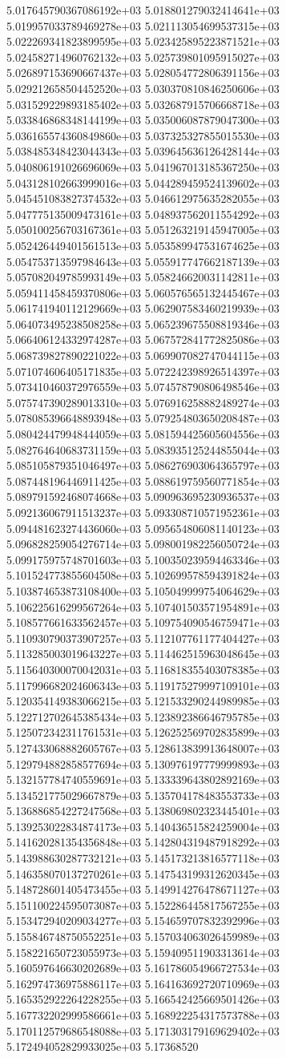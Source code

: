 	5.017645790367086192e+03	5.018801279032414641e+03	5.019957033789469278e+03	5.021113054699537315e+03	5.022269341823899595e+03	5.023425895223871521e+03	5.024582714960762132e+03	5.025739801095915027e+03	5.026897153690667437e+03	5.028054772806391156e+03	5.029212658504452520e+03	5.030370810846250606e+03	5.031529229893185402e+03	5.032687915706668718e+03	5.033846868348144199e+03	5.035006087879047300e+03	5.036165574360849860e+03	5.037325327855015530e+03	5.038485348423044343e+03	5.039645636126428144e+03	5.040806191026696069e+03	5.041967013185367250e+03	5.043128102663999016e+03	5.044289459524139602e+03	5.045451083827374532e+03	5.046612975635282055e+03	5.047775135009473161e+03	5.048937562011554292e+03	5.050100256703167361e+03	5.051263219145947005e+03	5.052426449401561513e+03	5.053589947531674625e+03	5.054753713597984643e+03	5.055917747662187139e+03	5.057082049785993149e+03	5.058246620031142811e+03	5.059411458459370806e+03	5.060576565132445467e+03	5.061741940112129669e+03	5.062907583460219939e+03	5.064073495238508258e+03	5.065239675508819346e+03	5.066406124332974287e+03	5.067572841772825086e+03	5.068739827890221022e+03	5.069907082747044115e+03	5.071074606405171835e+03	5.072242398926514397e+03	5.073410460372976559e+03	5.074578790806498546e+03	5.075747390289013310e+03	5.076916258882489274e+03	5.078085396648893948e+03	5.079254803650208487e+03	5.080424479948444059e+03	5.081594425605604556e+03	5.082764640683731159e+03	5.083935125244855044e+03	5.085105879351046497e+03	5.086276903064365797e+03	5.087448196446911425e+03	5.088619759560771854e+03	5.089791592468074668e+03	5.090963695230936537e+03	5.092136067911513237e+03	5.093308710571952361e+03	5.094481623274436060e+03	5.095654806081140123e+03	5.096828259054276714e+03	5.098001982256050724e+03	5.099175975748701603e+03	5.100350239594463346e+03	5.101524773855604508e+03	5.102699578594391824e+03	5.103874653873108400e+03	5.105049999754064629e+03	5.106225616299567264e+03	5.107401503571954891e+03	5.108577661633562457e+03	5.109754090546759471e+03	5.110930790373907257e+03	5.112107761177404427e+03	5.113285003019643227e+03	5.114462515963048645e+03	5.115640300070042031e+03	5.116818355403078385e+03	5.117996682024606343e+03	5.119175279997109101e+03	5.120354149383066215e+03	5.121533290244989985e+03	5.122712702645385434e+03	5.123892386646795785e+03	5.125072342311761531e+03	5.126252569702835899e+03	5.127433068882605767e+03	5.128613839913648007e+03	5.129794882858577694e+03	5.130976197779999893e+03	5.132157784740559691e+03	5.133339643802892169e+03	5.134521775029667879e+03	5.135704178483553733e+03	5.136886854227247568e+03	5.138069802323445401e+03	5.139253022834874173e+03	5.140436515824259004e+03	5.141620281354356848e+03	5.142804319487918292e+03	5.143988630287732121e+03	5.145173213816577118e+03	5.146358070137270261e+03	5.147543199312620345e+03	5.148728601405473455e+03	5.149914276478671127e+03	5.151100224595073087e+03	5.152286445817567255e+03	5.153472940209034277e+03	5.154659707832392996e+03	5.155846748750552251e+03	5.157034063026459989e+03	5.158221650723055973e+03	5.159409511903313614e+03	5.160597646630202689e+03	5.161786054966727534e+03	5.162974736975886117e+03	5.164163692720710969e+03	5.165352922264228255e+03	5.166542425669501426e+03	5.167732202999586661e+03	5.168922254317573788e+03	5.170112579686548088e+03	5.171303179169629402e+03	5.172494052829933025e+03	5.17368520